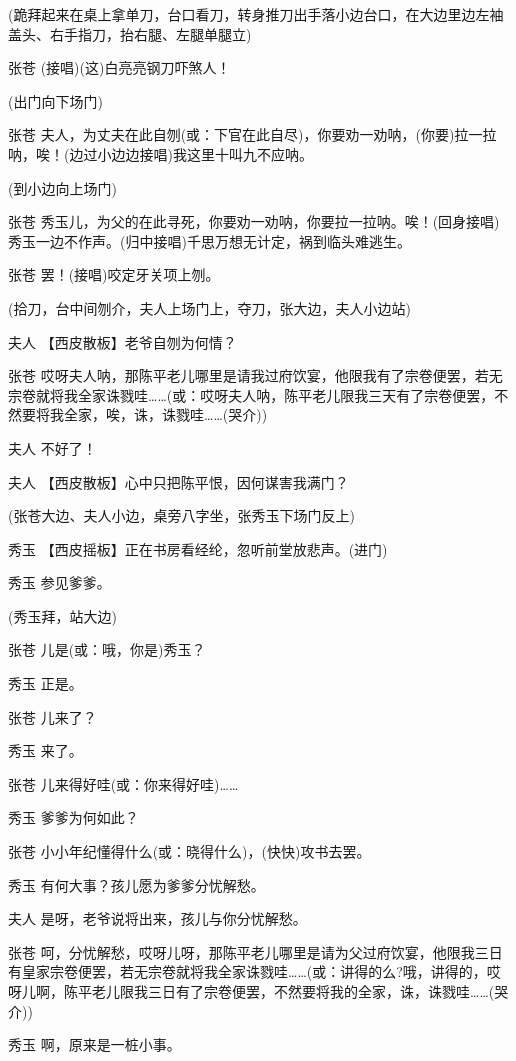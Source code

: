 (跪拜起来在桌上拿单刀，台口看刀，转身推刀出手落小边台口，在大边里边左袖盖头、右手指刀，抬右腿、左腿单腿立)

张苍 (接唱)(这)白亮亮钢刀吓煞人！

(出门向下场门)

张苍
夫人，为丈夫在此自刎(或：下官在此自尽)，你要劝一劝呐，(你要)拉一拉呐，唉！(边过小边边接唱)我这里十叫九不应呐。

(到小边向上场门)

张苍
秀玉儿，为父的在此寻死，你要劝一劝呐，你要拉一拉呐。唉！(回身接唱)秀玉一边不作声。(归中接唱)千思万想无计定，祸到临头难逃生。

张苍 罢！(接唱)咬定牙关项上刎。

(拾刀，台中间刎介，夫人上场门上，夺刀，张大边，夫人小边站)

夫人 【西皮散板】老爷自刎为何情？

张苍
哎呀夫人呐，那陈平老儿哪里是请我过府饮宴，他限我有了宗卷便罢，若无宗卷就将我全家诛戮哇\ldots{}\ldots{}(或：哎呀夫人呐，陈平老儿限我三天有了宗卷便罢，不然要将我全家，唉，诛，诛戮哇\ldots{}\ldots{}(哭介))

夫人 不好了！

夫人 【西皮散板】心中只把陈平恨，因何谋害我满门？

(张苍大边、夫人小边，桌旁八字坐，张秀玉下场门反上)

秀玉 【西皮摇板】正在书房看经纶，忽听前堂放悲声。(进门)

秀玉 参见爹爹。

(秀玉拜，站大边)

张苍 儿是(或：哦，你是)秀玉？

秀玉 正是。

张苍 儿来了？

秀玉 来了。

张苍 儿来得好哇(或：你来得好哇)\ldots{}\ldots{}

秀玉 爹爹为何如此？

张苍 小小年纪懂得什么(或：晓得什么)，(快快)攻书去罢。

秀玉 有何大事？孩儿愿为爹爹分忧解愁。

夫人 是呀，老爷说将出来，孩儿与你分忧解愁。

张苍
呵，分忧解愁，哎呀儿呀，那陈平老儿哪里是请为父过府饮宴，他限我三日有皇家宗卷便罢，若无宗卷就将我全家诛戮哇\ldots{}\ldots{}(或：讲得的么?哦，讲得的，哎呀儿啊，陈平老儿限我三日有了宗卷便罢，不然要将我的全家，诛，诛戮哇\ldots{}\ldots{}(哭介))

秀玉 啊，原来是一桩小事。

